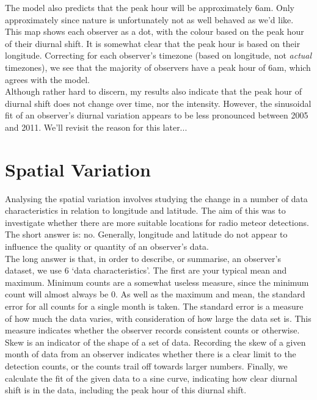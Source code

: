 \documentclass[12pt]{article}
\begin{document}
{{The model also predicts that the peak hour will be approximately 6am. Only
approximately since nature is unfortunately not as well behaved as we'd like.
This map shows each observer as a dot, with the colour based on the peak hour of
their diurnal shift. It is somewhat clear that the peak hour is based on their
longitude. Correcting for each observer's timezone (based on longitude, not {\it
actual} timezones), we see that the majority of observers have a peak hour of
6am, which agrees with the model.\\

Although rather hard to discern, my results also indicate that the peak hour of
diurnal shift does not change over time, nor the intensity. However, the
sinusoidal fit of an observer's diurnal variation appears to be less pronounced
between 2005 and 2011. We'll revisit the reason for this later...\\
}

\section{Spatial Variation}

\large{
Analysing the spatial variation involves studying the change in a number of data
characteristics in relation to longitude and latitude. The aim of this was to
investigate whether there are more suitable locations for radio meteor
detections. The short answer is: no. Generally, longitude and latitude do not
appear to influence the quality or quantity of an observer's data.\\

The long answer is that, in order to describe, or summarise, an observer's
dataset, we use 6 `data characteristics'. The first are your typical mean and
maximum. Minimum counts are a somewhat useless measure, since the minimum count
will almost always be 0. As well as the maximum and mean, the standard error for
all counts for a single month is taken. The standard error is a measure of how
much the data varies, with consideration of how large the data set is. This
measure indicates whether the observer records consistent counts or otherwise.
Skew is an indicator of the shape of a set of data. Recording the skew of a
given month of data from an observer indicates whether there is a clear limit to
the detection counts, or the counts trail off towards larger numbers. Finally,
we calculate the fit of the given data to a sine curve, indicating how clear
diurnal shift is in the data, including the peak hour of this diurnal shift.\\

}}
\end{document}
